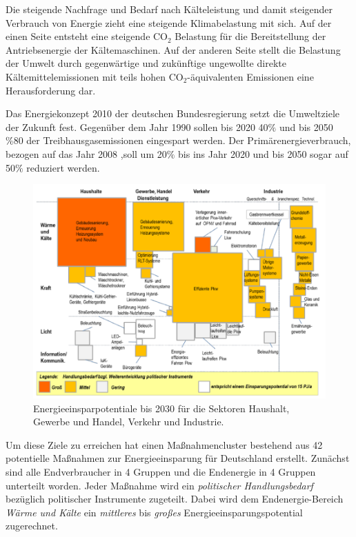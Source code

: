 Die steigende Nachfrage und Bedarf nach Kälteleistung und damit steigender Verbrauch von Energie zieht eine steigende Klimabelastung mit sich. Auf der einen Seite entsteht eine steigende CO$_{2}$ Belastung für die Bereitstellung der Antriebsenergie der Kältemaschinen. Auf der anderen Seite stellt die Belastung der Umwelt durch gegenwärtige und zukünftige ungewollte direkte Kältemittelemissionen mit teils hohen CO$_{2}$-äquivalenten Emissionen eine Herausforderung dar.

Das Energiekonzept 2010 der deutschen Bundesregierung setzt die Umweltziele der Zukunft fest. Gegenüber dem Jahr 1990 sollen bis 2020 40$\%$ und bis 2050 $\%80$ der Treibhausgasemissionen eingespart werden. Der Primärenergieverbrauch, bezogen auf das Jahr 2008 ,soll um 20$\%$  bis ins Jahr 2020 und bis 2050 sogar auf 50$\%$ reduziert werden. \citep{BMWi2010}

\begin{figure}[htb]
	\centering
		\includegraphics[width=.960\textwidth]{Pictures/Energieeinsparpotentiale_Pehnt.png}
\caption{Energieeinsparpotentiale bis 2030 für die Sektoren Haushalt, Gewerbe 		und Handel, Verkehr und Industrie.  \citep{Pehnt2011}}
	\label{fig:Energieeinsparpotentiale}
	\label{fig:Aufteilung nach Einsatzgebiet}
\end{figure}

Um diese Ziele zu erreichen hat \citeauthor{Pehnt2011} einen Maßnahmencluster bestehend aus 42 potentielle Maßnahmen zur Energieeinsparung für Deutschland erstellt. Zunächst sind alle Endverbraucher in 4 Gruppen und die Endenergie in 4 Gruppen unterteilt worden. Jeder Maßnahme wird ein \textit{politischer Handlungsbedarf} bezüglich politischer Instrumente zugeteilt. Dabei wird dem Endenergie-Bereich \textit{Wärme und Kälte} ein \textit{mittleres} bis \textit{großes} Energieeinsparungspotential zugerechnet. 


